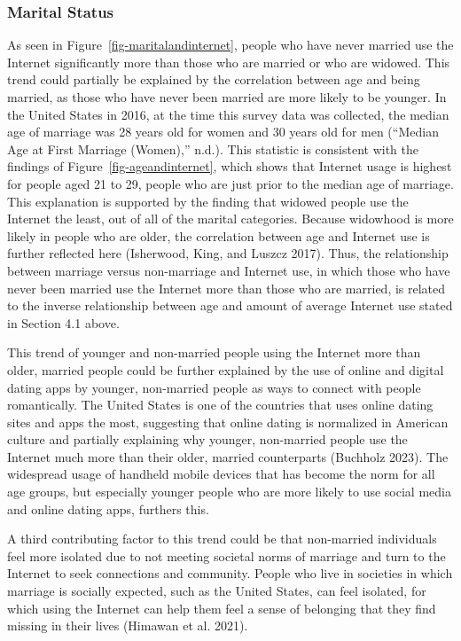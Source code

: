 \documentclass[
]{article}
\begin{document}
\hypertarget{marital-status}{%
\subsubsection{Marital Status}\label{marital-status}}

As seen in Figure~\ref{fig-maritalandinternet}, people who have never
married use the Internet significantly more than those who are married
or who are widowed. This trend could partially be explained by the
correlation between age and being married, as those who have never been
married are more likely to be younger. In the United States in 2016, at
the time this survey data was collected, the median age of marriage was
28 years old for women and 30 years old for men ({``Median Age at First
Marriage (Women),''} n.d.). This statistic is consistent with the
findings of Figure~\ref{fig-ageandinternet}, which shows that Internet
usage is highest for people aged 21 to 29, people who are just prior to
the median age of marriage. This explanation is supported by the finding
that widowed people use the Internet the least, out of all of the
marital categories. Because widowhood is more likely in people who are
older, the correlation between age and Internet use is further reflected
here (Isherwood, King, and Luszcz 2017). Thus, the relationship between
marriage versus non-marriage and Internet use, in which those who have
never been married use the Internet more than those who are married, is
related to the inverse relationship between age and amount of average
Internet use stated in Section 4.1 above.

This trend of younger and non-married people using the Internet more
than older, married people could be further explained by the use of
online and digital dating apps by younger, non-married people as ways to
connect with people romantically. The United States is one of the
countries that uses online dating sites and apps the most, suggesting
that online dating is normalized in American culture and partially
explaining why younger, non-married people use the Internet much more
than their older, married counterparts (Buchholz 2023). The widespread
usage of handheld mobile devices that has become the norm for all age
groups, but especially younger people who are more likely to use social
media and online dating apps, furthers this.

A third contributing factor to this trend could be that non-married
individuals feel more isolated due to not meeting societal norms of
marriage and turn to the Internet to seek connections and community.
People who live in societies in which marriage is socially expected,
such as the United States, can feel isolated, for which using the
Internet can help them feel a sense of belonging that they find missing
in their lives (Himawan et al. 2021).
\end{document}
